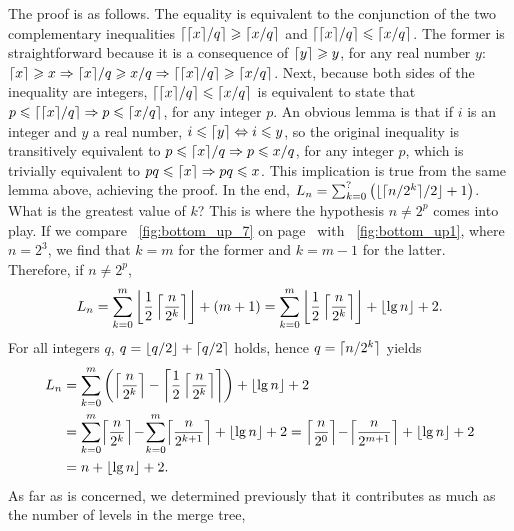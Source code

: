 The proof is as follows. The equality is equivalent to the conjunction
of the two complementary inequalities \(\lceil{\lceil{x}\rceil/q}\rceil
\geqslant \lceil{x/q}\rceil\) and \(\lceil{\lceil{x}\rceil/q}\rceil \leqslant
\lceil{x/q}\rceil\). The former is straightforward because it is a
consequence of \(\lceil{y}\rceil \geqslant y\), for any real number \(y\):
\(\lceil{x}\rceil \geqslant x \Rightarrow \lceil{x}\rceil/q \geqslant x/q
\Rightarrow \lceil{\lceil{x}\rceil/q}\rceil \geqslant \lceil{x/q}\rceil\). Next,
because both sides of the inequality are integers,
\(\lceil{\lceil{x}\rceil/q}\rceil \leqslant \lceil{x/q}\rceil\) is equivalent to
state that \(p \leqslant \lceil{\lceil{x}\rceil/q}\rceil \Rightarrow p
\leqslant \lceil{x/q}\rceil\), for any integer \(p\). An obvious lemma is
that if \(i\) is an integer and \(y\) a real number, \(i \leqslant
\lceil{y}\rceil \Leftrightarrow i \leqslant y\), so the original
inequality is transitively equivalent to \(p \leqslant \lceil{x}\rceil/q
\Rightarrow p \leqslant x/q\), for any integer \(p\), which is
trivially equivalent to \(pq \leqslant \lceil{x}\rceil \Rightarrow pq
\leqslant x\). This implication is true from the same lemma above,
achieving the proof. In the end, \(L_n =
\sum_{k=0}^{?}\left(\lfloor{\lceil{n/2^k}\rceil/2}\rfloor + 1\right)\). What is
the greatest value of \(k\)? This is where the hypothesis \(n \neq
2^p\) comes into play. If we compare \fig~\ref{fig:bottom_up_7} on
page~\pageref{fig:bottom_up_7} with \fig~\vref{fig:bottom_up1}, where
\(n=2^3\), we find that \(k=m\) for the former and \(k=m-1\) for the
latter. Therefore, if \(n \neq 2^p\),
\[
L_n = \sum_{k=0}^{m}
\left\lfloor\frac{1}{2}\left\lceil\frac{n}{2^k}\right\rceil\right\rfloor
+ (m + 1)
= \sum_{k=0}^{m}
\left\lfloor\frac{1}{2}\left\lceil\frac{n}{2^k}\right\rceil\right\rfloor
+ \lfloor{\lg n}\rfloor + 2.
\]
For all integers \(q\), \(q = \lfloor{q/2}\rfloor + \lceil{q/2}\rceil\) holds,
hence \(q=\lceil{n/2^k}\rceil\) yields
\begin{align*}
L_n &= \sum_{k=0}^{m}\left(\left\lceil\frac{n}{2^k}\right\rceil -
\left\lceil\frac{1}{2}\left\lceil\frac{n}{2^k}\right\rceil\right\rceil\right)
+ \lfloor{\lg n}\rfloor + 2\\ 
&= \sum_{k=0}^{m}{\!\left\lceil\frac{n}{2^k}\right\rceil} \! - \!
\sum_{k=0}^{m}{\!\left\lceil\frac{n}{2^{k+1}}\right\rceil} + \lfloor{\lg n}\rfloor + 2
 = \left\lceil\frac{n}{2^0}\right\rceil \! - \!
 \left\lceil\frac{n}{2^{m+1}}\right\rceil + \lfloor{\lg n}\rfloor + 2\\
&= n + \lfloor{\lg n}\rfloor + 2.
\end{align*}
As far as  is concerned, we determined previously that
it contributes as much as the number of levels in the merge tree,
